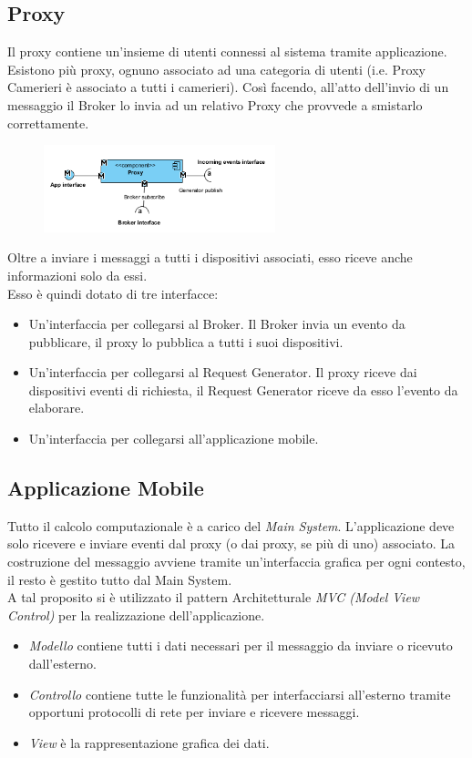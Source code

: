 \subsection{Proxy}
Il proxy contiene un'insieme di utenti connessi al sistema tramite applicazione. Esistono più proxy, ognuno associato ad una categoria di utenti (i.e. Proxy Camerieri è associato a tutti i camerieri). Così facendo, all'atto dell'invio di un messaggio il Broker lo invia ad un relativo Proxy che provvede a smistarlo correttamente. 
\begin{figure}[H]
	\centering
	\includegraphics[width=0.6\textwidth]{Immagini/proxy.png}
\end{figure}
Oltre a inviare i messaggi a tutti i dispositivi associati, esso riceve anche informazioni solo da essi.
\\Esso è quindi dotato di tre interfacce:
\begin{itemize}
	\item Un'interfaccia per collegarsi al Broker. Il Broker invia un evento da pubblicare, il proxy lo pubblica a tutti i suoi dispositivi.
	\item Un'interfaccia per collegarsi al Request Generator. Il proxy riceve dai dispositivi eventi di richiesta, il Request Generator riceve da esso l'evento da elaborare.
	\item Un'interfaccia per collegarsi all'applicazione mobile.
\end{itemize}

\subsection{Applicazione Mobile}
Tutto il calcolo computazionale è a carico del \textit{Main System}. L'applicazione deve solo ricevere e inviare eventi dal proxy (o dai proxy, se più di uno) associato. La costruzione del messaggio avviene tramite un'interfaccia grafica per ogni contesto, il resto è gestito tutto dal Main System.
\\A tal proposito si è utilizzato il pattern Architetturale \textit{MVC (Model View Control)} per la realizzazione dell'applicazione.
\begin{itemize}
	\item \textit{Modello} contiene tutti i dati necessari per il messaggio da inviare o ricevuto dall'esterno.
	\item \textit{Controllo} contiene tutte le funzionalità per interfacciarsi all'esterno tramite opportuni protocolli di rete per inviare e ricevere messaggi.
	\item \textit{View} è la rappresentazione grafica dei dati.
\end{itemize}



